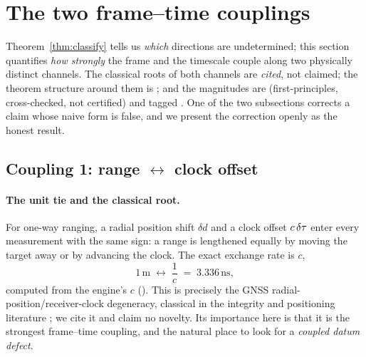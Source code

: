 \section{The two frame--time couplings}
\label{sec:couplings}

Theorem~\ref{thm:classify} tells us \emph{which} directions are undetermined; this section
quantifies \emph{how strongly} the frame and the timescale couple along two physically
distinct channels. The classical roots of both channels are \emph{cited}, not claimed; the
theorem structure around them is \Proven{}; and the magnitudes are \Modelled{}
(first-principles, cross-checked, not certified) and tagged \modtag{}. One of the two
subsections corrects a claim whose naive form is false, and we present the correction
openly as the honest result.

\subsection{Coupling 1: range \texorpdfstring{$\leftrightarrow$}{<->} clock offset}
\label{sec:coupling1}

\paragraph{The unit tie and the classical root.}
For one-way ranging, a radial position shift $\delta d$ and a clock offset $c\,\delta\tau$ enter
every measurement with the same sign: a range is lengthened equally by moving the target
away or by advancing the clock. The exact exchange rate is $c$,
\begin{equation}
  1\,\text{m}\;\longleftrightarrow\;\frac{1}{c}\;=\;3.336\,\text{ns},
  \label{eq:unittie}
\end{equation}
computed from the engine's $c$ (). This is precisely the
GNSS radial-position/receiver-clock degeneracy, classical in the integrity and positioning
literature \citep{sturza1988,brown1992,parkinson1988}; we cite it and claim no novelty. Its
importance here is that it is the strongest frame--time coupling, and the natural place to
look for a \emph{coupled datum defect}.

